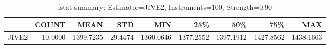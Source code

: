 \begin{table}[ht]
\centering
\caption{fstat summary: Estimator=JIVE2, Instruments=100, Strength=0.90}
\begin{tabular}{lrrrrrrrr}
\toprule
 & COUNT & MEAN & STD & MIN & 25\% & 50\% & 75\% & MAX \\
\midrule
JIVE2 & 10.0000 & 1399.7235 & 29.4474 & 1360.0646 & 1377.2552 & 1397.1912 & 1427.8562 & 1438.1663 \\
\bottomrule
\end{tabular}
\end{table}

